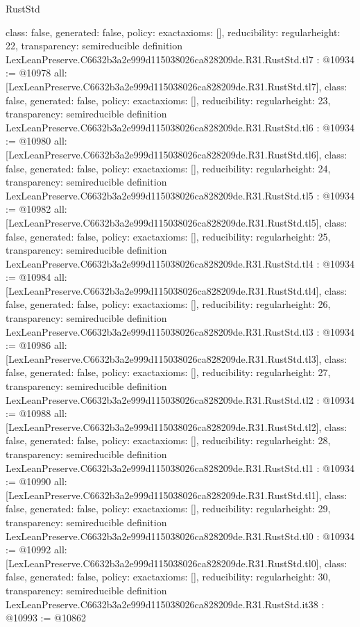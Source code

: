 \begin{lexlean}{RustStd}
\begin{coremodule}
{  class: false,
  generated: false,
  policy: exact{axioms: []},
  reducibility: regular{height: 22},
  transparency: semireducible
}
definition LexLeanPreserve.C6632b3a2e999d115038026ca828209de.R31.RustStd.tl7 : @10934 := @10978 {
  all: [LexLeanPreserve.C6632b3a2e999d115038026ca828209de.R31.RustStd.tl7],
  class: false,
  generated: false,
  policy: exact{axioms: []},
  reducibility: regular{height: 23},
  transparency: semireducible
}
definition LexLeanPreserve.C6632b3a2e999d115038026ca828209de.R31.RustStd.tl6 : @10934 := @10980 {
  all: [LexLeanPreserve.C6632b3a2e999d115038026ca828209de.R31.RustStd.tl6],
  class: false,
  generated: false,
  policy: exact{axioms: []},
  reducibility: regular{height: 24},
  transparency: semireducible
}
definition LexLeanPreserve.C6632b3a2e999d115038026ca828209de.R31.RustStd.tl5 : @10934 := @10982 {
  all: [LexLeanPreserve.C6632b3a2e999d115038026ca828209de.R31.RustStd.tl5],
  class: false,
  generated: false,
  policy: exact{axioms: []},
  reducibility: regular{height: 25},
  transparency: semireducible
}
definition LexLeanPreserve.C6632b3a2e999d115038026ca828209de.R31.RustStd.tl4 : @10934 := @10984 {
  all: [LexLeanPreserve.C6632b3a2e999d115038026ca828209de.R31.RustStd.tl4],
  class: false,
  generated: false,
  policy: exact{axioms: []},
  reducibility: regular{height: 26},
  transparency: semireducible
}
definition LexLeanPreserve.C6632b3a2e999d115038026ca828209de.R31.RustStd.tl3 : @10934 := @10986 {
  all: [LexLeanPreserve.C6632b3a2e999d115038026ca828209de.R31.RustStd.tl3],
  class: false,
  generated: false,
  policy: exact{axioms: []},
  reducibility: regular{height: 27},
  transparency: semireducible
}
definition LexLeanPreserve.C6632b3a2e999d115038026ca828209de.R31.RustStd.tl2 : @10934 := @10988 {
  all: [LexLeanPreserve.C6632b3a2e999d115038026ca828209de.R31.RustStd.tl2],
  class: false,
  generated: false,
  policy: exact{axioms: []},
  reducibility: regular{height: 28},
  transparency: semireducible
}
definition LexLeanPreserve.C6632b3a2e999d115038026ca828209de.R31.RustStd.tl1 : @10934 := @10990 {
  all: [LexLeanPreserve.C6632b3a2e999d115038026ca828209de.R31.RustStd.tl1],
  class: false,
  generated: false,
  policy: exact{axioms: []},
  reducibility: regular{height: 29},
  transparency: semireducible
}
definition LexLeanPreserve.C6632b3a2e999d115038026ca828209de.R31.RustStd.tl0 : @10934 := @10992 {
  all: [LexLeanPreserve.C6632b3a2e999d115038026ca828209de.R31.RustStd.tl0],
  class: false,
  generated: false,
  policy: exact{axioms: []},
  reducibility: regular{height: 30},
  transparency: semireducible
}
definition LexLeanPreserve.C6632b3a2e999d115038026ca828209de.R31.RustStd.it38 : @10993 := @10862 {
}
\end{coremodule}
\end{lexlean}
